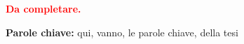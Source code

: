 \begin{flushright}
    \textbf{\textcolor{red}{Da completare.}} \hfill
\end{flushright}
\textbf{Parole chiave:} qui, vanno, le parole chiave, della tesi %